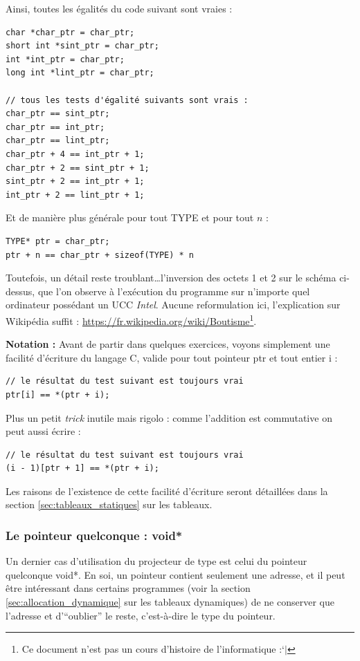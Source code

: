 \documentclass[../../../main.tex]{subfiles}
\begin{document}
Ainsi, toutes les égalités du code suivant sont vraies :
\begin{verbatim}
char *char_ptr = char_ptr;
short int *sint_ptr = char_ptr;
int *int_ptr = char_ptr;
long int *lint_ptr = char_ptr;

// tous les tests d'égalité suivants sont vrais :
char_ptr == sint_ptr;
char_ptr == int_ptr;
char_ptr == lint_ptr;
char_ptr + 4 ==	int_ptr + 1;
char_ptr + 2 == sint_ptr + 1;
sint_ptr + 2 == int_ptr + 1;
int_ptr + 2 == lint_ptr + 1;
\end{verbatim}
Et de manière plus générale pour tout \textsf{TYPE} et pour tout $n$ :
\begin{verbatim}
TYPE* ptr = char_ptr;
ptr + n == char_ptr + sizeof(TYPE) * n
\end{verbatim}
Toutefois, un détail reste troublant\dots l'inversion des octets 1 et 2 sur le schéma ci-dessus, que l'on observe à l'exécution du programme sur n'importe quel ordinateur possédant un UCC \textit{Intel}. 
Aucune reformulation ici, l'explication sur Wikipédia suffit : \url{https://fr.wikipedia.org/wiki/Boutisme}\footnote{Ce document n'est pas un cours d'histoire de l'informatique :`$|$}.
 
\textbf{Notation :} Avant de partir dans quelques exercices, voyons simplement une facilité d'écriture du langage C, valide pour tout pointeur \textsf{ptr} et tout entier \textsf{i} :
\begin{verbatim}
// le résultat du test suivant est toujours vrai
ptr[i] == *(ptr + i);
\end{verbatim}
Plus un petit \textit{trick} inutile mais rigolo : comme l'addition est commutative on peut aussi écrire :
\begin{verbatim}
// le résultat du test suivant est toujours vrai
(i - 1)[ptr + 1] == *(ptr + i);
\end{verbatim}
Les raisons de l'existence de cette facilité d'écriture seront détaillées dans la section \ref{sec:tableaux_statiques} sur les tableaux.
\subsubsection{Le pointeur quelconque : \textsf{void*}}
\label{ssub:le_pointeur_quelconque_void_}
Un dernier cas d'utilisation du projecteur de type est celui du pointeur quelconque \textsf{void*}. En soi, un pointeur contient seulement une adresse, et il peut être intéressant dans certains programmes (voir la section \ref{sec:allocation_dynamique} sur les tableaux dynamiques) de ne conserver que l'adresse et d'``oublier'' le reste, c'est-à-dire le type du pointeur.
 
\end{document}
